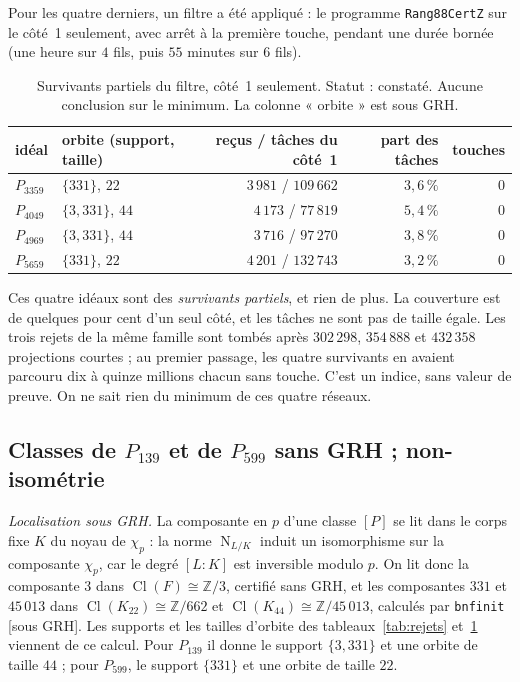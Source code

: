 \documentclass[11pt,a4paper]{amsart}
\theoremstyle{plain}
\theoremstyle{definition}
\numberwithin{equation}{section}
\newcommand{\Z}{\mathbb{Z}}
\DeclareMathOperator{\Nm}{N}
\DeclareMathOperator{\Cl}{Cl}
\newcommand{\st}[1]{\textup{\textsf{\small[#1]}}}
\newcommand{\GRH}{\st{sous GRH}}
\begin{document}
Pour les quatre derniers, un filtre a été appliqué : le programme \texttt{Rang88CertZ} sur le côté~1 seulement, avec arrêt à la première touche, pendant une durée bornée (une heure sur $4$ fils, puis $55$ minutes sur $6$ fils).

\begin{table}[ht]
\caption{Survivants partiels du filtre, côté~1 seulement. Statut : constaté. Aucune conclusion sur le minimum. La colonne « orbite » est sous GRH.}\label{tab:survivants}
\centering\small
\begin{tabular}{llrrr}
\toprule
idéal & orbite (support, taille) & reçus / tâches du côté~1 & part des tâches & touches \\
\midrule
$P_{3359}$ & $\{331\}$, $22$ & $3\,981$ / $109\,662$ & $3{,}6\,\%$ & $0$ \\
$P_{4049}$ & $\{3,331\}$, $44$ & $4\,173$ / $77\,819$ & $5{,}4\,\%$ & $0$ \\
$P_{4969}$ & $\{3,331\}$, $44$ & $3\,716$ / $97\,270$ & $3{,}8\,\%$ & $0$ \\
$P_{5659}$ & $\{331\}$, $22$ & $4\,201$ / $132\,743$ & $3{,}2\,\%$ & $0$ \\
\bottomrule
\end{tabular}
\end{table}

Ces quatre idéaux sont des \emph{survivants partiels}, et rien de plus. La couverture est de quelques pour cent d'un seul côté, et les tâches ne sont pas de taille égale. Les trois rejets de la même famille sont tombés après $302\,298$, $354\,888$ et $432\,358$ projections courtes ; au premier passage, les quatre survivants en avaient parcouru dix à quinze millions chacun sans touche. C'est un indice, sans valeur de preuve. On ne sait rien du minimum de ces quatre réseaux.

\subsection{Classes de \texorpdfstring{$P_{139}$}{P139} et de \texorpdfstring{$P_{599}$}{P599} sans GRH ; non-isométrie}\label{subsec:classes}

\emph{Localisation sous GRH.} La composante en $p$ d'une classe $[P]$ se lit dans le corps fixe $K$ du noyau de $\chi_p$ : la norme $\Nm_{L/K}$ induit un isomorphisme sur la composante $\chi_p$, car le degré $[L:K]$ est inversible modulo $p$. On lit donc la composante $3$ dans $\Cl(F)\cong\Z/3$, certifié sans GRH, et les composantes $331$ et $45\,013$ dans $\Cl(K_{22})\cong\Z/662$ et $\Cl(K_{44})\cong\Z/45\,013$, calculés par \texttt{bnfinit} \GRH. Les supports et les tailles d'orbite des tableaux~\ref{tab:rejets} et~\ref{tab:survivants} viennent de ce calcul. Pour $P_{139}$ il donne le support $\{3,331\}$ et une orbite de taille $44$ ; pour $P_{599}$, le support $\{331\}$ et une orbite de taille $22$.
\end{document}

